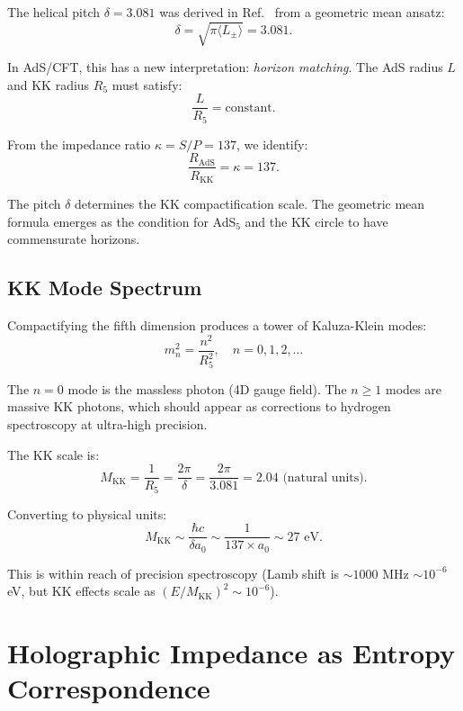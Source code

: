 \documentclass[aps,prd,twocolumn,superscriptaddress,floatfix]{revtex4-2}
\begin{document}
The helical pitch $\delta = 3.081$ was derived in Ref.~\cite{companion_alpha} from a geometric mean ansatz:
\begin{equation}
\delta = \sqrt{\pi \langle L_\pm \rangle} = 3.081.
\end{equation}

In AdS/CFT, this has a new interpretation: \textit{horizon matching}. The AdS radius $L$ and KK radius $R_5$ must satisfy:
\begin{equation}
\frac{L}{R_5} = \text{constant}.
\end{equation}

From the impedance ratio $\kappa = S/P = 137$, we identify:
\begin{equation}
\frac{R_{\text{AdS}}}{R_{\text{KK}}} = \kappa = 137.
\end{equation}

The pitch $\delta$ determines the KK compactification scale. The geometric mean formula emerges as the condition for AdS$_5$ and the KK circle to have commensurate horizons.

\subsection{KK Mode Spectrum}

Compactifying the fifth dimension produces a tower of Kaluza-Klein modes:
\begin{equation}
m_n^2 = \frac{n^2}{R_5^2}, \quad n = 0, 1, 2, \ldots
\end{equation}

The $n=0$ mode is the massless photon (4D gauge field). The $n \geq 1$ modes are massive KK photons, which should appear as corrections to hydrogen spectroscopy at ultra-high precision.

The KK scale is:
\begin{equation}
M_{\text{KK}} = \frac{1}{R_5} = \frac{2\pi}{\delta} = \frac{2\pi}{3.081} = 2.04 \text{ (natural units)}.
\end{equation}

Converting to physical units:
\begin{equation}
M_{\text{KK}} \sim \frac{\hbar c}{\delta a_0} \sim \frac{1}{137 \times a_0} \sim 27 \text{ eV}.
\end{equation}

This is within reach of precision spectroscopy (Lamb shift is $\sim 1000$ MHz $\sim 10^{-6}$ eV, but KK effects scale as $(E/M_{\text{KK}})^2 \sim 10^{-6}$).


\section{Holographic Impedance as Entropy Correspondence}
\end{document}
